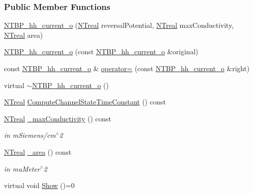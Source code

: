 \subsubsection*{Public Member Functions}
\begin{DoxyCompactItemize}
\item 
\hyperlink{class_n_t_b_p__hh__current__o_a88823be53566bbdcb32f2898e342bdae}{NTBP\_\-hh\_\-current\_\-o} (\hyperlink{nt__types_8h_a814a97893e9deb1eedcc7604529ba80d}{NTreal} reversalPotential, \hyperlink{nt__types_8h_a814a97893e9deb1eedcc7604529ba80d}{NTreal} maxConductivity, \hyperlink{nt__types_8h_a814a97893e9deb1eedcc7604529ba80d}{NTreal} area)
\item 
\hyperlink{class_n_t_b_p__hh__current__o_a4bbfca48489a3205dd9fcb06f54b623e}{NTBP\_\-hh\_\-current\_\-o} (const \hyperlink{class_n_t_b_p__hh__current__o}{NTBP\_\-hh\_\-current\_\-o} \&original)
\item 
const \hyperlink{class_n_t_b_p__hh__current__o}{NTBP\_\-hh\_\-current\_\-o} \& \hyperlink{class_n_t_b_p__hh__current__o_a7cb9f60f4a86099d3f846be4d7ae51af}{operator=} (const \hyperlink{class_n_t_b_p__hh__current__o}{NTBP\_\-hh\_\-current\_\-o} \&right)
\item 
virtual \hyperlink{class_n_t_b_p__hh__current__o_aae377f8fd7f1089df9ee1da5c74417c7}{$\sim$NTBP\_\-hh\_\-current\_\-o} ()
\item 
\hyperlink{nt__types_8h_a814a97893e9deb1eedcc7604529ba80d}{NTreal} \hyperlink{class_n_t_b_p__hh__current__o_a04236bffc5d911ad96f9511d9138d5c5}{ComputeChannelStateTimeConstant} () const 
\item 
\hyperlink{nt__types_8h_a814a97893e9deb1eedcc7604529ba80d}{NTreal} \hyperlink{class_n_t_b_p__hh__current__o_ae7fffab61f6911866623d00f98f507f9}{\_\-maxConductivity} () const 
\begin{DoxyCompactList}\small\item\em in mSiemens/cm$^\wedge$2 \item\end{DoxyCompactList}\item 
\hyperlink{nt__types_8h_a814a97893e9deb1eedcc7604529ba80d}{NTreal} \hyperlink{class_n_t_b_p__hh__current__o_abbdd17adcec4913ae8894b58f0ec8126}{\_\-area} () const 
\begin{DoxyCompactList}\small\item\em in muMeter$^\wedge$2 \item\end{DoxyCompactList}\item 
virtual void \hyperlink{class_n_t_b_p__hh__current__o_a80525cbc11f5d8c471e2b9fac53fa166}{Show} ()=0
\end{DoxyCompactItemize}


